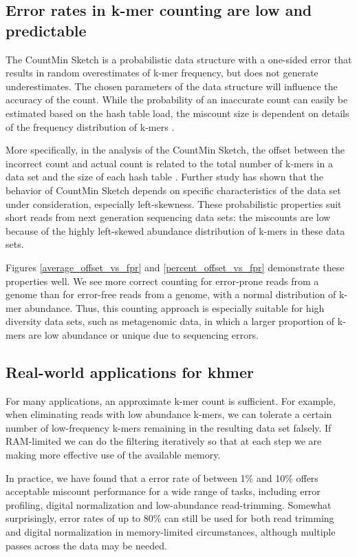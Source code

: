 \documentclass{article}
\begin{document}
\subsection{Error rates in k-mer counting are low and predictable}

The CountMin Sketch is a probabilistic data structure with a
one-sided error that results in random overestimates of k-mer
frequency, but does not generate underestimates. The chosen parameters
of the data structure will influence the accuracy of the count.  While
the probability of an inaccurate count can easily be estimated based
on the hash table load, the miscount size is dependent on details of
the frequency distribution of k-mers \cite{Cormode2005}.

More specifically, in the analysis of the CountMin
Sketch, the offset between the incorrect count and
actual count is related to the total number of k-mers in a data set and
the size of each hash table \cite{Cormode2005}. Further study has shown that the behavior
of CountMin Sketch depends on specific characteristics of the data
set under consideration, especially left-skewness\cite{Rusu2008,
  CormodeM05}.  These probabilistic properties suit short reads
from next generation sequencing data sets: the miscounts are
low because of the
highly left-skewed abundance distribution of k-mers in these data sets.

Figures \ref{average_offset_vs_fpr} and \ref{percent_offset_vs_fpr}
demonstrate these properties well.  We see more correct
counting for error-prone reads from a genome than for error-free
reads from a genome, with a normal
distribution of k-mer abundance.  Thus, this counting approach is
especially suitable for high diversity data sets, such as metagenomic
data, in which a larger proportion of k-mers are low abundance or
unique due to sequencing errors.

\subsection{Real-world applications for khmer}

For many applications, an approximate k-mer count is sufficient.  For
example, when eliminating reads with low abundance k-mers, we
can tolerate a certain number of low-frequency k-mers remaining in
the resulting data set falsely.  If RAM-limited we can do the
filtering iteratively so that at each step we are making more
effective use of the available memory.

In practice, we have found that a error rate of between 1\%
and 10\% offers acceptable miscount performance for a wide range of
tasks, including error profiling, digital normalization and
low-abundance read-trimming.  Somewhat surprisingly, error
rates of up to 80\% can still be used for both read trimming and
digital normalization in memory-limited circumstances, although
multiple passes across the data may be needed.
\end{document}
